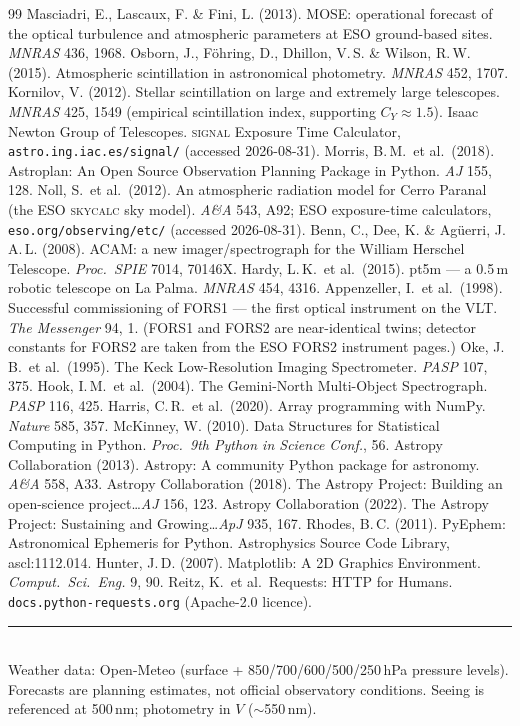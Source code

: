 \documentclass[11pt]{article}
\begin{document}
\begin{thebibliography}{99}
 Masciadri, E., Lascaux, F. \& Fini, L. (2013). MOSE: operational forecast of the optical turbulence and atmospheric parameters at ESO ground-based sites. \emph{MNRAS} 436, 1968.
 Osborn, J., F\"ohring, D., Dhillon, V.\,S. \& Wilson, R.\,W. (2015). Atmospheric scintillation in astronomical photometry. \emph{MNRAS} 452, 1707.
 Kornilov, V. (2012). Stellar scintillation on large and extremely large telescopes. \emph{MNRAS} 425, 1549 (empirical scintillation index, supporting $C_Y\approx1.5$).
 Isaac Newton Group of Telescopes. \textsc{signal} Exposure Time Calculator, \texttt{astro.ing.iac.es/signal/} (accessed 2026-08-31).
 Morris, B.\,M.\ et al.\ (2018). Astroplan: An Open Source Observation Planning Package in Python. \emph{AJ} 155, 128.
 Noll, S.\ et al.\ (2012). An atmospheric radiation model for Cerro Paranal (the ESO \textsc{skycalc} sky model). \emph{A\&A} 543, A92; ESO exposure-time calculators, \texttt{eso.org/observing/etc/} (accessed 2026-08-31).
 Benn, C., Dee, K. \& Ag\"uerri, J.\,A.\,L. (2008). ACAM: a new imager/spectrograph for the William Herschel Telescope. \emph{Proc.\ SPIE} 7014, 70146X.
 Hardy, L.\,K.\ et al.\ (2015). pt5m --- a 0.5\,m robotic telescope on La Palma. \emph{MNRAS} 454, 4316.
 Appenzeller, I.\ et al.\ (1998). Successful commissioning of FORS1 --- the first optical instrument on the VLT. \emph{The Messenger} 94, 1. (FORS1 and FORS2 are near-identical twins; detector constants for FORS2 are taken from the ESO FORS2 instrument pages.)
 Oke, J.\,B.\ et al.\ (1995). The Keck Low-Resolution Imaging Spectrometer. \emph{PASP} 107, 375.
 Hook, I.\,M.\ et al.\ (2004). The Gemini-North Multi-Object Spectrograph. \emph{PASP} 116, 425.
 Harris, C.\,R.\ et al.\ (2020). Array programming with NumPy. \emph{Nature} 585, 357.
 McKinney, W. (2010). Data Structures for Statistical Computing in Python. \emph{Proc.\ 9th Python in Science Conf.}, 56.
 Astropy Collaboration (2013). Astropy: A community Python package for astronomy. \emph{A\&A} 558, A33.
 Astropy Collaboration (2018). The Astropy Project: Building an open-science project\ldots \emph{AJ} 156, 123.
 Astropy Collaboration (2022). The Astropy Project: Sustaining and Growing\ldots \emph{ApJ} 935, 167.
 Rhodes, B.\,C. (2011). PyEphem: Astronomical Ephemeris for Python. Astrophysics Source Code Library, ascl:1112.014.
 Hunter, J.\,D. (2007). Matplotlib: A 2D Graphics Environment. \emph{Comput.\ Sci.\ Eng.} 9, 90.
 Reitz, K.\ et al.\ Requests: HTTP for Humans. \texttt{docs.python-requests.org} (Apache-2.0 licence).
\end{thebibliography}

\vspace{4pt}
\noindent\rule{\textwidth}{0.4pt}\\
{\small Weather data: Open-Meteo (surface + 850/700/600/500/250\,hPa pressure levels).
Forecasts are planning estimates, not official observatory conditions. Seeing is
referenced at 500\,nm; photometry in $V$ ($\sim$550\,nm).}
\end{document}
